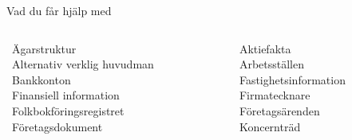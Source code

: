 \documentclass[10pt]{beamer}
\begin{document}
\begin{frame}[plain]
  \begin{block}{Vad du får hjälp med}
    \begin{columns}[T]
      \begin{column}{0.48\textwidth}
        \textbullet\ Ägarstruktur \\
        \textbullet\ Alternativ verklig huvudman \\
        \textbullet\ Bankkonton \\
        \textbullet\ Finansiell information \\
        \textbullet\ Folkbokföringsregistret \\
        \textbullet\ Företagsdokument
      \end{column}
      \begin{column}{0.48\textwidth}
        \textbullet\ Aktiefakta \\
        \textbullet\ Arbetsställen \\
        \textbullet\ Fastighetsinformation \\
        \textbullet\ Firmatecknare \\
        \textbullet\ Företagsärenden \\
        \textbullet\ Koncernträd
      \end{column}
    \end{columns}
  \end{block}

  \vspace{0.5cm}

   \hspace{0.5cm} 
\end{frame}
\end{document}
